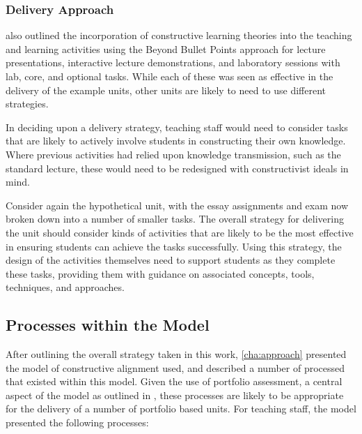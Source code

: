 
\subsubsection{Delivery Approach} %
\label{ssub:delivery_approach}

 also outlined the incorporation of constructive learning theories into the teaching and learning activities using the Beyond Bullet Points approach for lecture presentations, interactive lecture demonstrations, and laboratory sessions with lab, core, and  optional tasks. While each of these was seen as effective in the delivery of the example units, other units are likely to need to use different strategies. 

In deciding upon a delivery strategy, teaching staff would need to consider tasks that are likely to actively involve students in constructing their own knowledge. Where previous activities had relied upon knowledge transmission, such as the standard lecture, these would need to be redesigned with constructivist ideals in mind.

Consider again the hypothetical unit, with the essay assignments and exam now broken down into a number of smaller tasks. The overall strategy for delivering the unit should consider kinds of activities that are likely to be the most effective in ensuring students can achieve the tasks successfully. Using this strategy, the design of the activities themselves need to support students as they complete these tasks, providing them with guidance on associated concepts, tools, techniques, and approaches.


\subsection{Processes within the Model} %
\label{sub:processes_within_the_model}

After outlining the overall strategy taken in this work, \cref{cha:approach} presented the model of constructive alignment used, and described a number of processed that existed within this model. Given the use of portfolio assessment, a central aspect of the model as outlined in , these processes are likely to be appropriate for the delivery of a number of portfolio based units. For teaching staff, the model presented the following processes:

